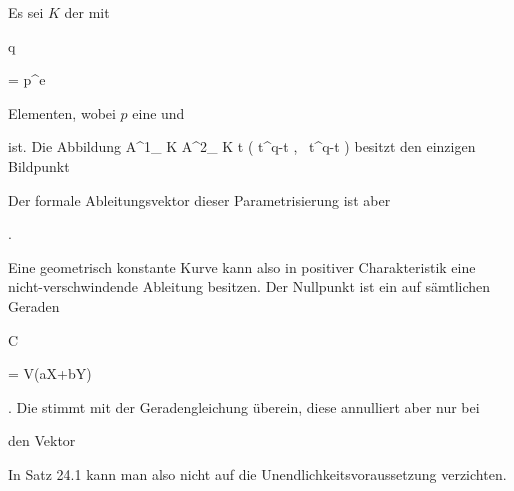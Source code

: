 
{


Es sei $K$ der
mit


\mavergleichskette

{\vergleichskette

{q
}

{ = }{ p^e
}

{  }{
}

{    }{
}

{   }{
}

}
{}{}{}
Elementen, wobei $p$ eine
und

 ist. Die Abbildung
\maabbeledisp {} { {\mathbb A}^{1}_{ K } } { {\mathbb A}^{2}_{ K }
} { t } { \left( t^q-t  , \,  t^q-t                   \right)
} {}
besitzt den einzigen Bildpunkt

 Der formale Ableitungsvektor dieser Parametrisierung ist aber


 { . }


Eine geometrisch konstante Kurve kann also in positiver Charakteristik eine nicht-verschwindende Ableitung besitzen. Der Nullpunkt ist ein
auf sämtlichen Geraden


\mavergleichskette

{\vergleichskette

{C
}

{ = }{ V(aX+bY)
}

{  }{
}

{    }{
}

{   }{
}

}
{}{}{.}
Die
stimmt mit der Geradengleichung überein, diese annulliert aber nur bei

 den Vektor

 In
Satz 24.1
kann man also nicht auf die Unendlichkeitsvoraussetzung verzichten.


}



